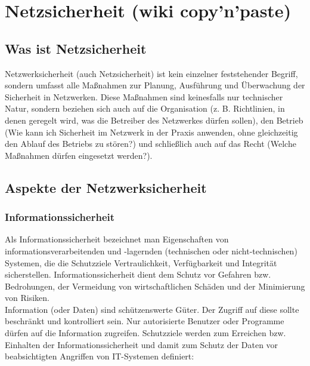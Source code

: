 \chapter{Netzsicherheit (wiki copy'n'paste)}
\section{Was ist Netzsicherheit}
Netzwerksicherheit (auch Netzsicherheit) ist kein einzelner feststehender Begriff, sondern umfasst alle Maßnahmen zur Planung, Ausführung und Überwachung der Sicherheit in Netzwerken. Diese Maßnahmen sind keinesfalls nur technischer Natur, sondern beziehen sich auch auf die Organisation (z. B. Richtlinien, in denen geregelt wird, was die Betreiber des Netzwerkes dürfen sollen), den Betrieb (Wie kann ich Sicherheit im Netzwerk in der Praxis anwenden, ohne gleichzeitig den Ablauf des Betriebs zu stören?) und schließlich auch auf das Recht (Welche Maßnahmen dürfen eingesetzt werden?).
\section{Aspekte der Netzwerksicherheit}
\subsection{Informationssicherheit}
Als Informationssicherheit bezeichnet man Eigenschaften von informationsverarbeitenden und -lagernden (technischen oder nicht-technischen) Systemen, die die Schutzziele Vertraulichkeit, Verfügbarkeit und Integrität sicherstellen. Informationssicherheit dient dem Schutz vor Gefahren bzw. Bedrohungen, der Vermeidung von wirtschaftlichen Schäden und der Minimierung von Risiken.\\

Information (oder Daten) sind schützenswerte Güter. Der Zugriff auf diese sollte beschränkt und kontrolliert sein. Nur autorisierte Benutzer oder Programme dürfen auf die Information zugreifen. Schutzziele werden zum Erreichen bzw. Einhalten der Informationssicherheit und damit zum Schutz der Daten vor beabsichtigten Angriffen von IT-Systemen definiert:

